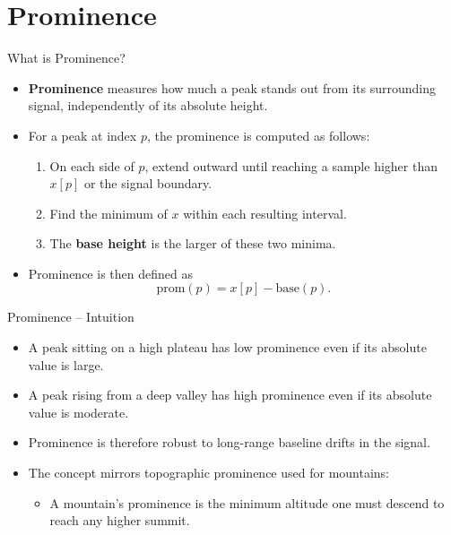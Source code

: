 \documentclass{beamer}
\begin{document}
\section{Prominence}

\begin{frame}{What is Prominence?}
  \begin{itemize}
    \item \textbf{Prominence} measures how much a peak stands out from its surrounding signal, independently of its absolute height.
    \item For a peak at index \(p\), the prominence is computed as follows:
    \begin{enumerate}
      \item On each side of \(p\), extend outward until reaching a sample higher than \(x[p]\) or the signal boundary.
      \item Find the minimum of \(x\) within each resulting interval.
      \item The \textbf{base height} is the larger of these two minima.
    \end{enumerate}
    \item Prominence is then defined as
    \begin{equation}
      \text{prom}(p) = x[p] - \text{base}(p).
    \end{equation}
  \end{itemize}
\end{frame}

\begin{frame}{Prominence -- Intuition}
  \begin{itemize}
    \item A peak sitting on a high plateau has low prominence even if its absolute value is large.
    \item A peak rising from a deep valley has high prominence even if its absolute value is moderate.
    \item Prominence is therefore robust to long-range baseline drifts in the signal.
    \item The concept mirrors topographic prominence used for mountains:
    \begin{itemize}
      \item A mountain's prominence is the minimum altitude one must descend to reach any higher summit.
    \end{itemize}
  \end{itemize}
\end{frame}
\end{document}
